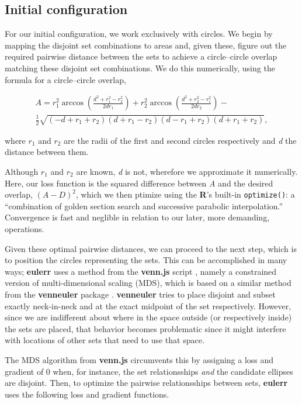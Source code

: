 \documentclass[
  headsepline=true,headings=standardclasses%
]{scrartcl}
\theoremstyle{definition}
\theoremstyle{definition}
\theoremstyle{definition}
\theoremstyle{remark}
\begin{document}
\subsection{Initial configuration}\label{initial-configuration}

For our initial configuration, we work exclusively with circles. We
begin by mapping the disjoint set combinations to areas and, given
these, figure out the required pairwise distance between the sets to
achieve a circle--circle overlap matching these disjoint set
combinations. We do this numerically, using the formula for a
circle--circle overlap,

\begin{multline}
A = r_1^2\arccos\left(\frac{d^2 + r_1^2 - r_2^2}{2dr_1}\right) + 
r_2^2\arccos\left(\frac{d^2 + r_2^2 - r_1^2}{2dr_2}\right) - \\
\frac{1}{2}\sqrt{(-d + r_1 + r_2)(d + r_1 - r_2)(d - r_1 + r_2)(d + r_1 + r_2)},
\end{multline}

where \(r_1\) and \(r_2\) are the radii of the first and second circles
respectively and \emph{d} the distance between them.

Although \(r_1\) and \(r_2\) are known, \emph{d} is not, wherefore we
approximate it numerically. Here, our loss function is the squared
difference between \emph{A} and the desired overlap, \((A-D)^2\), which
we then ptimize using the \textbf{R}'s built-in \texttt{optimize()}: a
``combination of golden section search and successive parabolic
interpolation.'' Convergence is fast and neglible in relation to our
later, more demanding, operations.

Given these optimal pairwise distances, we can proceed to the next step,
which is to position the circles representing the sets. This can be
accomplished in many ways; \textbf{eulerr} uses a method from the
\textbf{venn.js} script \autocite{frederickson_2016}, namely a
constrained version of multi-dimensional scaling (MDS), which is based
on a similar method from the \textbf{venneuler} package
\autocite{wilkinson_2012}. \textbf{venneuler} tries to place disjoint
and subset exactly neck-in-neck and at the exact midpoint of the set
respectively. However, since we are indifferent about where in the space
outside (or respectively inside) the sets are placed, that behavior
becomes problematic since it might interfere with locations of other
sets that need to use that space.

The MDS algorithm from \textbf{venn.js} circumvents this by assigning a
loss and gradient of 0 when, for instance, the set relationsships
\emph{and} the candidate ellipses are disjoint. Then, to optimize the
pairwise relationsships between sets, \textbf{eulerr} uses the following
loss and gradient functions.
\end{document}
